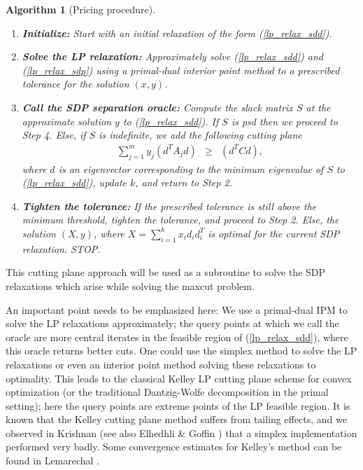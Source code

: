 \documentclass[12pt]{article}
\newtheorem{algorithm1}{Algorithm}
\newenvironment{algorithm}[1]{\begin{algorithm1}[#1]~\\
    \vspace{-0.5cm}}{\end{algorithm1}}
\begin{document}
\begin{algorithm}{Pricing procedure}
\begin{enumerate}
\item {\bf Initialize:} Start with an initial relaxation of the
form (\ref{lp_relax_sdd}). \item {\bf Solve the LP relaxation:}
Approximately solve (\ref{lp_relax_sdd}) and (\ref{lp_relax_sdp})
using a primal-dual interior point method to a prescribed
tolerance for the solution $(x,y)$. \item {\bf Call the SDP
separation oracle:} Compute the slack matrix $S$ at the
approximate solution $y$ to (\ref{lp_relax_sdd}). If $S$ is psd
then we proceed to Step 4. Else, if $S$ is indefinite, we add the
following cutting plane
\begin{displaymath}
\begin{array}{ccc}
\displaystyle \sum_{j=1}^my_j(d^TA_jd) & \geq & (d^TCd),
\end{array}
\end{displaymath}
where $d$ is an eigenvector corresponding to the minimum
eigenvalue of $S$ to (\ref{lp_relax_sdd}), update $k$, and return
to Step 2. \item {\bf Tighten the tolerance:} If the prescribed
tolerance is still above the minimum threshold, tighten the
tolerance, and proceed to Step 2. Else, the solution $(X,y)$,
where $X = \displaystyle \sum_{i=1}^kx_id_id_i^T$ is optimal for
the current SDP relaxation. STOP.
\end{enumerate}
\end{algorithm}
This cutting plane approach will be used as a subroutine to solve
the SDP relaxations which arise while solving the maxcut problem.

An important point needs to be emphasized here: We use a
primal-dual IPM to solve the LP relaxations approximately; the
query points at which we call the oracle are more central iterates
in the feasible region of (\ref{lp_relax_sdd}), where this oracle
returns better cuts. One could use the simplex method to solve the
LP relaxations or even an interior point method solving these
relaxations to optimality. This leads to the classical Kelley LP
cutting plane scheme \cite{Kelley} for convex optimization (or the
traditional Dantzig-Wolfe decomposition in the primal setting);
here the query points are extreme points of the LP feasible
region. It is known that the Kelley cutting plane method suffers
from tailing effects, and we observed in Krishnan \cite{kartik3}
(see also Elhedhli \& Goffin \cite{elhedhli_goffin}) that a
simplex implementation performed very badly. Some convergence
estimates for Kelley's method can be found in Lemarechal
\cite{lemarechal}.
\end{document}
